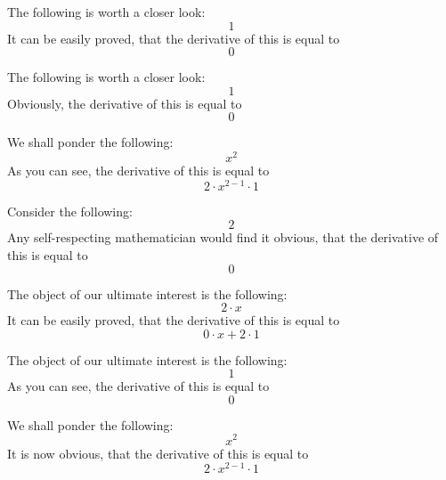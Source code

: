 \documentclass{article}
\begin{document}
The following is worth a closer look:
\begin{equation}
1 
\end{equation}
It can be easily proved, that the derivative of this is equal to
\begin{equation}
0 
\end{equation}

The following is worth a closer look:
\begin{equation}
1 
\end{equation}
Obviously, the derivative of this is equal to
\begin{equation}
0 
\end{equation}

We shall ponder the following:
\begin{equation}
x ^{2 } 
\end{equation}
As you can see, the derivative of this is equal to
\begin{equation}
2 \cdot x ^{2 - 1 } \cdot 1 
\end{equation}

Consider the following:
\begin{equation}
2 
\end{equation}
Any self-respecting mathematician would find it obvious, that the derivative of this is equal to
\begin{equation}
0 
\end{equation}

The object of our ultimate interest is the following:
\begin{equation}
2 \cdot x 
\end{equation}
It can be easily proved, that the derivative of this is equal to
\begin{equation}
0 \cdot x + 2 \cdot 1 
\end{equation}

The object of our ultimate interest is the following:
\begin{equation}
1 
\end{equation}
As you can see, the derivative of this is equal to
\begin{equation}
0 
\end{equation}

We shall ponder the following:
\begin{equation}
x ^{2 } 
\end{equation}
It is now obvious, that the derivative of this is equal to
\begin{equation}
2 \cdot x ^{2 - 1 } \cdot 1 
\end{equation}
\end{document}
